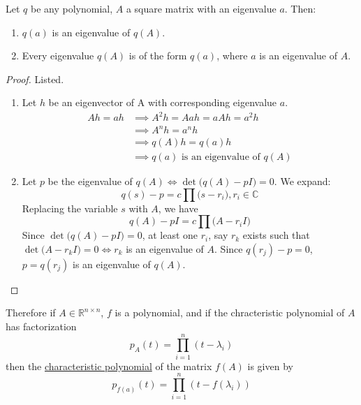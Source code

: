   \begin{theorem}
    \label{thm:spectral-mapping-theorem}
    Let $q$ be any polynomial, $A$ a square matrix with an eigenvalue $a$. Then: 
    \begin{enumerate}
      \item $q(a)$ is an eigenvalue of $q(A)$. 
      \item Every eigenvalue $q(A)$ is of the form $q(a)$, where $a$ is an eigenvalue of $A$. 
    \end{enumerate}
  \end{theorem}
  \begin{proof} 
    Listed. 
    \begin{enumerate}
      \item Let $h$ be an eigenvector of A with corresponding eigenvalue $a$. 
				\begin{align*}
					Ah = ah & \implies A^{2} h = Aah = aAh = a^{2} h \\
					 & \implies A^{n} h = a^{n} h   \\
					 & \implies q(A)h = q(a)h \\
					 & \implies q(a) \text{ is an eigenvalue of }q(A)
				\end{align*}

      \item Let $p$ be the eigenvalue of $q(A) \iff \det{\big(q(A) - p I\big)} = 0$. We expand: 
        \begin{equation}
          q(s) - p = c\prod \big(s-r_{i}\big), r_{i} \in \mathbb{C}
        \end{equation}
        Replacing the variable $s$ with $A$, we have
        \begin{equation}
          q(A) - pI = c \prod \big(A-r_{i}I\big)
        \end{equation}
        Since $\det{\big( q(A) - pI\big)} = 0$, at least one $r_{i}$, say $r_{k}$ exists such that $\det{\big( A - r_{k} I \big)} = 0 \iff r_{k}$ is an eigenvalue of $A$. Since $q(r_{j})-p = 0$, $p = q(r_{j})$ is an eigenvalue of $q(A)$. 
    \end{enumerate}
  \end{proof}

	Therefore if $A \in \mathbb{R}^{n \times n}$, $f$ is a polynomial, and if the chracteristic polynomial of $A$ has factorization 
	\begin{equation}
		p_A (t) = \prod_{i = 1}^n (t - \lambda_i)
	\end{equation}
	then the \hyperref[def:characteristic-polynomial]{characteristic polynomial} of the matrix $f(A)$ is given by 
	\begin{equation}
		p_{f(a)} (t) = \prod_{i = 1}^n (t - f(\lambda_i))
	\end{equation}

